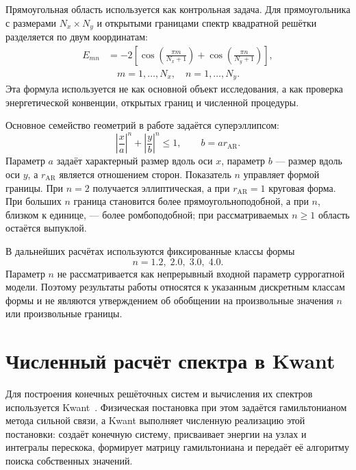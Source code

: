 Прямоугольная область используется как контрольная задача. Для прямоугольника с размерами
$N_x \times N_y$ и открытыми границами спектр квадратной решётки разделяется по двум
координатам:
\begin{equation}
\begin{aligned}
  E_{mn}
  &=
  -2
  \left[
    \cos\left(\frac{\pi m}{N_x+1}\right)
    +
    \cos\left(\frac{\pi n}{N_y+1}\right)
  \right], \\
  &\quad
  m=1,\ldots,N_x,\quad n=1,\ldots,N_y .
\end{aligned}
\end{equation}
Эта формула используется не как основной объект исследования, а как проверка
энергетической конвенции, открытых границ и численной процедуры.

Основное семейство геометрий в работе задаётся суперэллипсом:
\begin{equation}
  \left|\frac{x}{a}\right|^n
  +
  \left|\frac{y}{b}\right|^n
  \leq 1,
  \qquad
  b = a r_{\mathrm{AR}} .
\end{equation}
Параметр $a$ задаёт характерный размер вдоль оси $x$, параметр $b$ --- размер вдоль оси
$y$, а $r_{\mathrm{AR}}$ является отношением сторон. Показатель $n$ управляет формой
границы. При $n=2$ получается эллиптическая, а при $r_{\mathrm{AR}}=1$ круговая форма. При
больших $n$ граница становится более прямоугольноподобной, а при $n$, близком к единице,
--- более ромбоподобной; при рассматриваемых $n\geq 1$ область остаётся выпуклой.

В дальнейших расчётах используются фиксированные классы формы
\[
  n = 1.2,\;2.0,\;3.0,\;4.0 .
\]
Параметр $n$ не рассматривается как непрерывный входной параметр суррогатной модели.
Поэтому результаты работы относятся к указанным дискретным классам формы и не являются
утверждением об обобщении на произвольные значения $n$ или произвольные границы.

\section{Численный расчёт спектра в Kwant}

Для построения конечных решёточных систем и вычисления их спектров используется
Kwant~\cite{groth2014kwant}. Физическая постановка при этом задаётся гамильтонианом метода
сильной связи, а Kwant выполняет численную реализацию этой постановки: создаёт конечную
систему, присваивает энергии на узлах и интегралы перескока, формирует матрицу
гамильтониана и передаёт её алгоритму поиска собственных значений.

